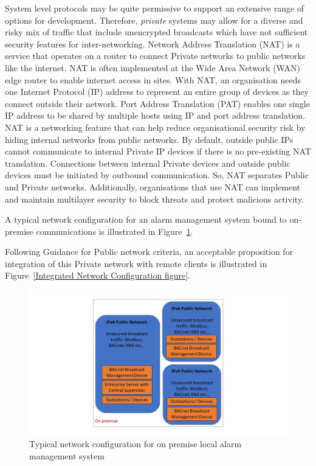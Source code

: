 \documentclass[11pt, oneside]{book}   	%
\begin{document}
System level protocols may be quite permissive to support an extensive range of options for development.
Therefore, \emph{private} systems may allow for a diverse and risky mix of traffic that include unencrypted broadcasts which have not sufficient security features for inter-networking.
Network Address Translation (NAT) is a service that operates on a router to connect Private networks to public networks like the internet.
NAT is often implemented at the Wide Area Network (WAN) edge router to enable internet access in sites.
With NAT, an organisation needs one Internet Protocol (IP) address to represent an entire group of devices as they connect outside their network.
Port Address Translation (PAT) enables one single IP address to be shared by multiple hosts using IP and port address translation.
NAT is a networking feature that can help reduce organisational security risk by hiding internal networks from public networks.
By default, outside public IPs cannot communicate to internal Private IP devices if there is no pre-existing NAT translation.
Connections between internal Private devices and outside public devices must be initiated by outbound communication.
So, NAT separates Public and Private networks.
Additionally, organisations that use NAT can implement and maintain multilayer security to block threats and protect malicious activity.

A typical network configuration for an alarm management system bound to on-premise communications is illustrated in Figure~\ref{Typical Network Configuration figure}.\

Following Guidance for Public network criteria, an acceptable proposition for integration of this Private network with remote clients is illustrated in Figure~\ref{Integrated Network Configuration figure}.

\pagebreak

\FloatBarrier
\begin{figure}
\begin{center}
\includegraphics[width=1\textwidth]{typicalPrivateNetwork.jpg}
\caption{Typical network configuration for on premise local alarm management system}
\label{Typical Network Configuration figure}
\end{center}
\end{figure}
\FloatBarrier
\end{document}
